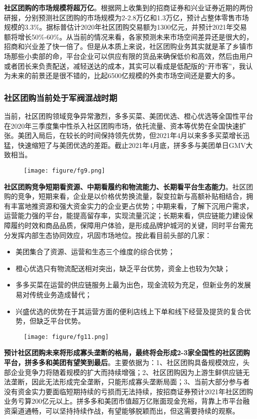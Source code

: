 \documentclass[UTF8,a4paper,12pt,lang=cn,fontset = windows]{elegantpaper} %
\begin{document}
\textbf{社区团购的市场规模将超万亿}。根据网上收集到的招商证券和兴业证券近期的两份研报，分别预测社区团购的市场规模为2-2.8万亿和1.3万亿，预计占整体零售市场规模的3.3\%。据标普估计2020年社区团购交易额为1300亿元，并预计2021年交易额将增长50\%-60\%。从当前的情况来看，各家预测未来市场空间差异还是很大的，招商和兴业差了快一倍了。但是从本质上来说，社区团购业务其实就是革了乡镇市场那些小卖部的命，平台企业可以供应有限的货品来确保低价和高效，然后由用户或者团长来负责配送，减轻送达的成本，其实可以看成是低配版的“开市客”，我认为未来的前景还是很不错的，比起6500亿规模的外卖市场空间还是要大的多。
\subsubsection{社区团购当前处于军阀混战时期}
当前，社区团购领域竞争异常激烈，多多买菜、美团优选、橙心优选等全国性平台在2020年三季度集中性杀入社区团购市场，依托流量、资本等优势在全国快速扩张。美团入局后，在较长的时间保持领先优势，但2021年4月以来多多买菜增长迅猛，快速缩短了与美团优选的差距。截止2021年4月底，拼多多与美团单日GMV大致相当。

\begin{figure}[htbp]
  \centering
  \texttt{[image: figure/fg9.png]}
  \end{figure}

\textbf{社区团购竞争短期看资源、中期看履约和物流能力、长期看平台生态能力}。社区团购的竞争，短期来看，企业是以价格优势换流量，裂变拉新与高额补贴相结合，拥有丰富地推资源和强大资金实力的企业更占优势；中期来看，了解下沉用户需求，运营能力强的平台，能提高留存率，实现流量沉淀；长期来看，供应链能力建设保障履约时效和商品品质，保障用户体验，是形成品牌护城河的关键，同时平台需充分发挥内部生态协同效应，巩固市场地位。按此看目前头部的几家：

\begin{itemize}
  \item 美团集合了资源、运营和生态三个维度的综合优势；
  \item 橙心优选只有物流配送相对突出，缺乏平台优势，资金上也较为欠缺；
  \item 多多买菜在运营的供应链服务上最为出色，现金流较为充足，但新业务的发展易对传统业务造成替代；
  \item 兴盛优选的优势在于其运营方面的便利店线上下单和线下经营及提货的复合优势，但缺乏平台优势。
  \end{itemize}
  
  \begin{figure}[htbp]
    \centering
    \texttt{[image: figure/fg11.png]}
    \end{figure}
\textbf{预计社区团购未来将形成寡头垄断的格局，最终将会形成2-3家全国性的社区团购平台，拼多多和美团有望笑到最后}。主要依据为：1、社区团购具备规模效应，头部企业竞争力将随着规模的扩大而持续增强；2、社区团购因为上游生鲜供应链无法垄断，因此无法形成完全垄断，只能形成寡头垄断局面；3、当前大部分参与者没有资金实力要面临短期持续的亏损而无法持续，按招商证券预计2021年社区团购业务亏算200亿元以上。拼多多和美团市值超万亿账面现金充裕，背靠上市平台融资渠道通畅，可以坚持持续作战，有望能够脱颖而出，但这需要持续的观察。
\end{document}

